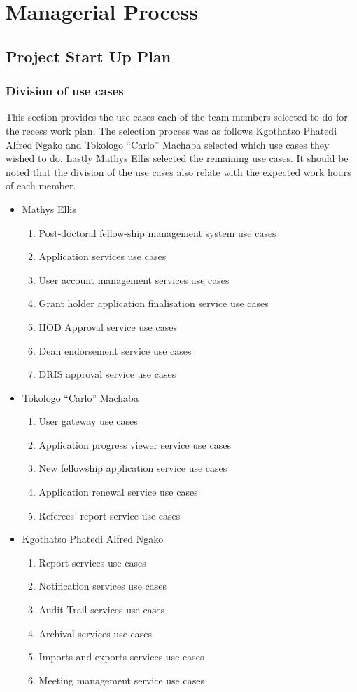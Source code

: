 \documentclass[12pt]{article}
\begin{document}
\section{Managerial Process}
\subsection{Project Start Up Plan}
\subsubsection{Division of use cases}
This section provides the use cases each of the team members selected to do for the recess work plan. The selection process was as follows Kgothatso Phatedi Alfred Ngako and Tokologo “Carlo” Machaba selected which use cases they wished to do. Lastly Mathys Ellis selected the remaining use cases. It should be noted that the division of the use cases also relate with the expected work hours of each member.
\begin{itemize}
	\item Mathys Ellis
	\begin{enumerate}
		\item Post-doctoral fellow-ship management system use cases
		\item Application services use cases
		\item User account management services use cases
		\item Grant holder application finalisation service use cases
		\item HOD Approval service use cases
		\item Dean endorsement service use cases
		\item DRIS approval service use cases
	\end{enumerate}
	\item Tokologo “Carlo” Machaba
	\begin{enumerate}
		\item User gateway use cases
		\item Application progress viewer service use cases
		\item New fellowship application service use cases
		\item Application renewal service use cases
		\item Referees' report service use cases
	\end{enumerate}
	\item Kgothatso Phatedi Alfred Ngako
	\begin{enumerate}
		\item Report services use cases
		\item Notification services use cases
		\item Audit-Trail services use cases
		\item Archival services use cases
		\item Imports and exports services use cases
		\item Meeting management service use cases
	\end{enumerate}
\end{itemize}
\end{document}
